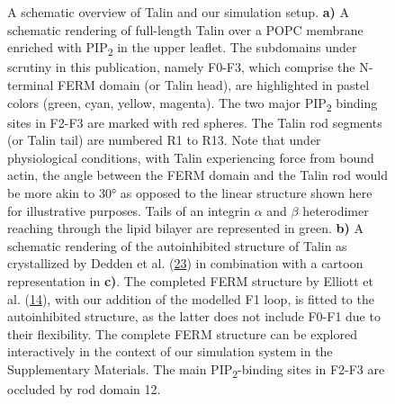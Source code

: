 \documentclass[
  twocolumn]{biophys-new-mod}
\begin{document}
\begin{figure}
\begin{minipage}[t]{0.50\linewidth}
{\centering 


}

\subcaption{\label{fig-tln-align-autoinhib}~}
\end{minipage}%

\caption{\label{fig-structure}A schematic overview of Talin and our
simulation setup. \textbf{a)} A schematic rendering of full-length Talin
over a POPC membrane enriched with PIP\textsubscript{2} in the upper
leaflet. The subdomains under scrutiny in this publication, namely
F0-F3, which comprise the N-terminal FERM domain (or Talin head), are
highlighted in pastel colors (green, cyan, yellow, magenta). The two
major PIP\textsubscript{2} binding sites in F2-F3 are marked with red
spheres. The Talin rod segments (or Talin tail) are numbered R1 to R13.
Note that under physiological conditions, with Talin experiencing force
from bound actin, the angle between the FERM domain and the Talin rod
would be more akin to 30° as opposed to the linear structure shown here
for illustrative purposes. Tails of an integrin \(\alpha\) and \(\beta\)
heterodimer reaching through the lipid bilayer are represented in green.
\textbf{b)} A schematic rendering of the autoinhibited structure of
Talin as crystallized by Dedden et al.
(\protect\hyperlink{ref-deddenArchitectureTalin1Reveals2019a}{23}) in
combination with a cartoon representation in \textbf{c)}. The completed
FERM structure by Elliott et al.
(\protect\hyperlink{ref-elliottStructureTalinHead2010}{14}), with our
addition of the modelled F1 loop, is fitted to the autoinhibited
structure, as the latter does not include F0-F1 due to their
flexibility. The complete FERM structure can be explored interactively
in the context of our simulation system in the Supplementary Materials.
The main PIP\textsubscript{2}-binding sites in F2-F3 are occluded by rod
domain 12.}

\end{figure}
\end{document}
